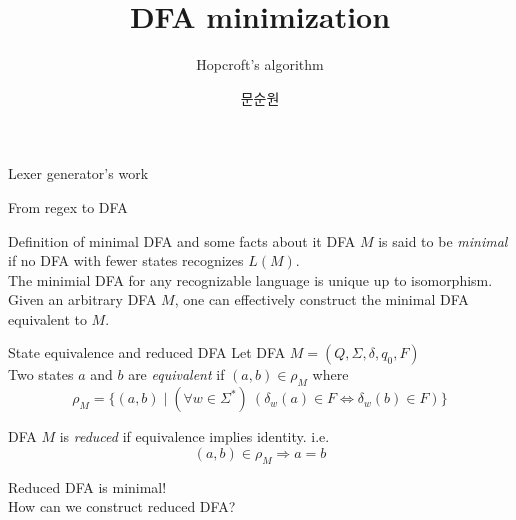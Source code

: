 \documentclass{beamer}
\title{DFA minimization}
\subtitle{Hopcroft's algorithm}
\author{문순원}
\date{}
\begin{document}
\begin{frame}
  \titlepage
\end{frame}

\begin{frame}{Lexer generator's work}
  \begin{block}{From regex to DFA}
  \end{block}
\end{frame}

\begin{frame}{Definition of minimal DFA and some facts about it}
  \small
  DFA \(M\) is said to be \textit{minimal} if no DFA with fewer states recognizes \(L(M)\). \\[1em]
  The minimial DFA for any recognizable language is unique up to isomorphism. \\[1em]
  Given an arbitrary DFA \(M\), one can effectively construct the minimal DFA equivalent to \(M\).
\end{frame}

\begin{frame}[t]{State equivalence and reduced DFA}
  Let DFA \(M = (Q, \Sigma, \delta, q_0, F)\) \\[1em]

  Two states \(a\) and \(b\) are \textit{equivalent} if \( (a,b) \in \rho_M \) where
  \[ \rho_M = \{ (a,b) \mid (\forall w \in \Sigma^*) \ (\delta_w(a) \in F \Leftrightarrow \delta_w(b) \in F) \} \]

  \pause
  DFA \(M\) is \textit{reduced} if equivalence implies identity. i.e.
  \[ (a,b) \in \rho_M \Rightarrow a = b \]

  \pause
  { \color{blue}
    Reduced DFA is minimal! \\
    How can we construct reduced DFA?
  }
\end{frame}
\end{document}
